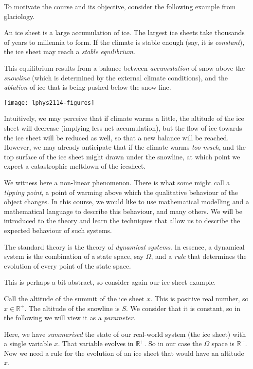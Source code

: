 To motivate the course and its objective, consider the following example
from glaciology.

An ice sheet is a large accumulation of ice. The largest ice sheets take
thousands of years to millennia to form. If the climate is stable enough
(say, it is \emph{constant}), the ice sheet may reach a \emph{stable}
\emph{equilibrium}.

This equilibrium results from a balance between \emph{accumulation} of
snow above the \emph{snowline} (which is determined by the external
climate conditions), and the \emph{ablation} of ice that is being pushed
below the snow line.

\texttt{[image: lphys2114-figures]}

Intuitively, we may perceive that if climate warms a little, the
altitude of the ice sheet will decrease (implying less net
accumulation), but the flow of ice towards the ice sheet will be reduced
as well, so that a new balance will be reached. However, we may already
anticipate that if the climate warms \emph{too much}, and the top
surface of the ice sheet might drawn under the snowline, at which point
we expect a catastrophic meltdown of the icesheet.

We witness here a non-linear phenomenon. There is what some might call a
\emph{tipping point}, a point of warming above which the qualitative
behaviour of the object changes. In this course, we would like to use
mathematical modelling and a mathematical language to describe this
behaviour, and many others. We will be introduced to the theory and
learn the techniques that allow us to describe the expected behaviour of
such systems.

The standard theory is the theory of \emph{dynamical systems}. In
essence, a dynamical system is the combination of a state space, say
\(\Omega\), and a \emph{rule} that determines the evolution of every
point of the state space.

This is perhaps a bit abstract, so consider again our ice sheet example.

Call the altitude of the summit of the ice sheet \(x\). This is positive
real number, so \(x \in \mathbb{R}^+\). The altitude of the snowline is
\(S\). We consider that it is constant, so in the following we will view
it as a \emph{parameter}.

Here, we have \emph{summarised} the state of our real-world system (the
ice sheet) with a single variable \(x\). That variable evolves in
\(\mathbb{R}^+\). So in our case the \(\Omega\) space is
\(\mathbb{R}^+\). Now we need a rule for the evolution of an ice sheet
that would have an altitude \(x\).

